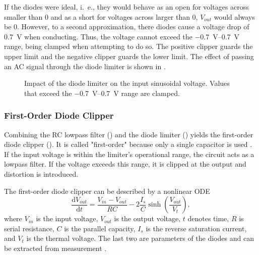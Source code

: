 If the diodes were ideal, i.\ e., they would behave as an open for voltages across smaller than 0 and as a short for voltages across larger than 0, $V_{out}$ would always be 0. However, to a second approximation, there diodes cause a voltage drop of \SI{0.7}{V} when conducting. Thus, the voltage cannot exceed the \SIrange{-0.7}{0.7}{V} range, being clamped when attempting to do so. The positive clipper guards the upper limit and the negative clipper guards the lower limit. The effect of passing an \ac{AC} signal through the diode limiter is shown in .

\begin{figure}
  \centering
  
  \caption{Impact of the diode limiter on the input sinusoidal voltage. Values that exceed the \SIrange{-0.7}{0.7}{V} range are clamped.}
  \label{fig:diode_limiter_signal}
\end{figure}


\subsubsection*{First-Order Diode Clipper}
Combining the RC lowpass filter () and the diode limiter () yields the first-order diode clipper (). It is called "first-order" because only a single capacitor is used \cite{Parker2019}. If the input voltage is within the limiter's operational range, the circuit acts as a lowpass filter. If the voltage exceeds this range, it is clipped at the output and distortion is introduced.

The first-order diode clipper can be described by a nonlinear \ac{ODE} \cite{Yeh2007}
\begin{equation}
  \frac{\mathrm{d} V_{out}}{\mathrm{d}t} = \frac{V_{in} - V_{out}}{RC} - 2 \frac{I_s}{C} \sinh \left(\frac{V_{out}}{V_t}\right),
\end{equation}
where $V_{in}$ is the input voltage, $V_{out}$ is the output voltage, $t$ denotes time, $R$ is serial resistance, $C$ is the parallel capacity, $I_s$ is the reverse saturation current, and $V_t$ is the thermal voltage. The last two are parameters of the diodes and can be extracted from measurement \cite{Yeh2007}. 


